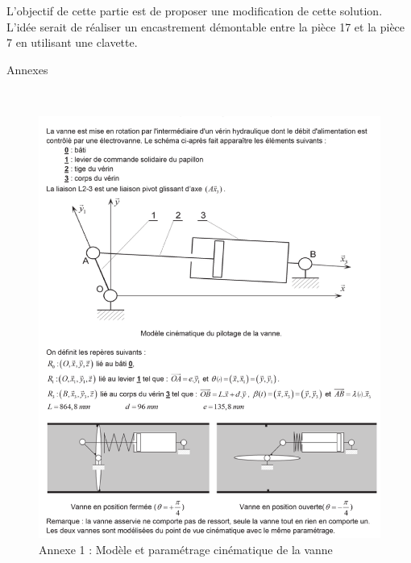 L'objectif de cette partie est de proposer une modification de cette solution. L'idée serait de réaliser un encastrement démontable entre la pièce 17 et la pièce 7 en utilisant une clavette.


\newpage

\begin{center}
\Huge{Annexes}
\end{center}

~\

\begin{figure}[ht!]
\begin{center}
 \includegraphics[width=\linewidth]{img/a1}
\end{center}
\caption{Annexe 1 : Modèle et paramétrage cinématique de la vanne}
\label{a1}
\end{figure}

